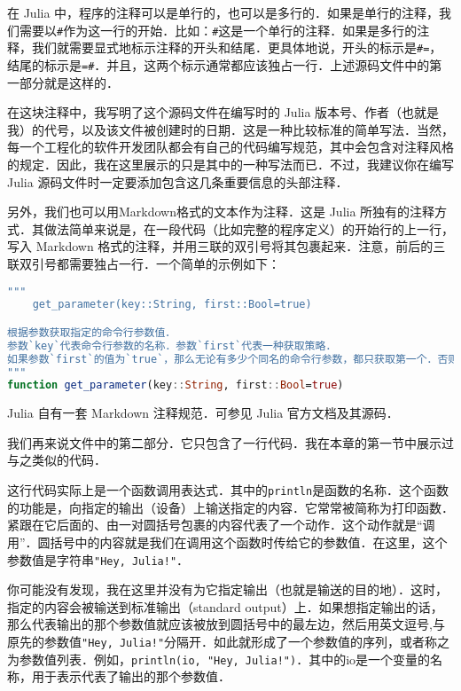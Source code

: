 在 Julia 中，程序的注释可以是单行的，也可以是多行的．如果是单行的注释，我们需要以\verb|#|作为这一行的开始．比如：\verb|#|这是一个单行的注释．如果是多行的注释，我们就需要显式地标示注释的开头和结尾．更具体地说，开头的标示是\verb|#=|，结尾的标示是\verb|=#|．并且，这两个标示通常都应该独占一行．上述源码文件中的第一部分就是这样的．

在这块注释中，我写明了这个源码文件在编写时的 Julia 版本号、作者（也就是我）的代号，以及该文件被创建时的日期．这是一种比较标准的简单写法．当然，每一个工程化的软件开发团队都会有自己的代码编写规范，其中会包含对注释风格的规定．因此，我在这里展示的只是其中的一种写法而已．不过，我建议你在编写 Julia 源码文件时一定要添加包含这几条重要信息的头部注释．

另外，我们也可以用Markdown格式的文本作为注释．这是 Julia 所独有的注释方式．其做法简单来说是，在一段代码（比如完整的程序定义）的开始行的上一行，写入 Markdown 格式的注释，并用三联的双引号将其包裹起来．注意，前后的三联双引号都需要独占一行．一个简单的示例如下：

\begin{lstlisting}[language=julia]
"""
    get_parameter(key::String, first::Bool=true)

根据参数获取指定的命令行参数值．
参数`key`代表命令行参数的名称．参数`first`代表一种获取策略．
如果参数`first`的值为`true`，那么无论有多少个同名的命令行参数，都只获取第一个．否则只获取最后一个．
"""
function get_parameter(key::String, first::Bool=true)
\end{lstlisting}

Julia 自有一套 Markdown 注释规范．可参见 Julia 官方文档及其源码．

我们再来说文件中的第二部分．它只包含了一行代码．我在本章的第一节中展示过与之类似的代码．

这行代码实际上是一个函数调用表达式．其中的\verb|println|是函数的名称．这个函数的功能是，向指定的输出（设备）上输送指定的内容．它常常被简称为打印函数．紧跟在它后面的、由一对圆括号包裹的内容代表了一个动作．这个动作就是“调用”．圆括号中的内容就是我们在调用这个函数时传给它的参数值．在这里，这个参数值是字符串\verb|"Hey, Julia!"|．

你可能没有发现，我在这里并没有为它指定输出（也就是输送的目的地）．这时，指定的内容会被输送到标准输出（standard output）上．如果想指定输出的话，那么代表输出的那个参数值就应该被放到圆括号中的最左边，然后用英文逗号,与原先的参数值\verb|"Hey, Julia!"|分隔开．如此就形成了一个参数值的序列，或者称之为参数值列表．例如，\verb|println(io, "Hey, Julia!")|．其中的io是一个变量的名称，用于表示代表了输出的那个参数值．

